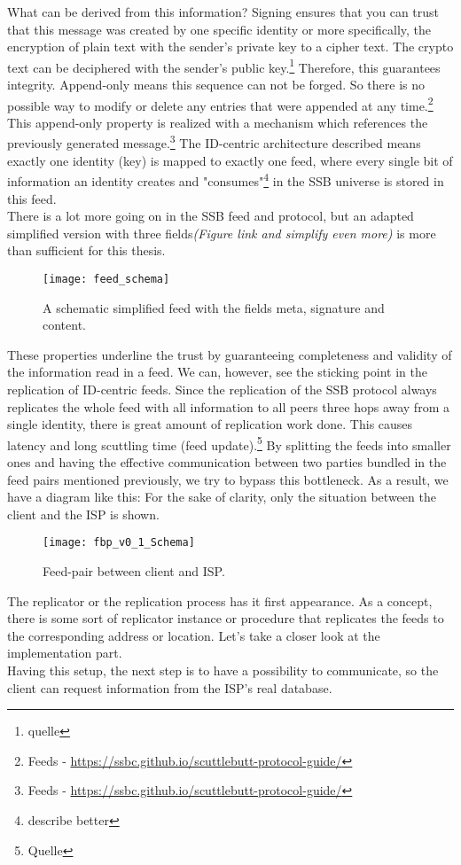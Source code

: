 What can be derived from this information? Signing ensures that you can trust that this message was created by one specific identity or more specifically, the encryption of plain text with the sender’s private key to a cipher text. The crypto text can be deciphered with the sender’s public key.\footnote{quelle} Therefore, this guarantees integrity. Append-only means this sequence can not be forged. So there is no possible way to modify or delete any entries that were appended at any time.\footnote{Feeds - \url{https://ssbc.github.io/scuttlebutt-protocol-guide/}} This append-only property is realized with a mechanism which references the previously generated message.\footnote{Feeds - \url{https://ssbc.github.io/scuttlebutt-protocol-guide/}} The ID-centric architecture described means exactly one identity (key) is mapped to exactly one feed, where every single bit of information an identity creates and "consumes"\footnote{describe better} in the SSB universe is stored in this feed.
\\
There is a lot more going on in the SSB feed and protocol, but an adapted simplified version with three fields\textit{(Figure link and simplify even more)} is more than sufficient for this thesis. 

\begin{figure}
    \centering
    \texttt{[image: feed\_schema]}
    \caption{A schematic simplified feed with the fields meta, signature and content.}
    \label{fig:feed_schema}
\end{figure}



These properties underline the trust by guaranteeing completeness and validity of the information read in a feed. We can, however, see the sticking point in the replication of ID-centric feeds. Since the replication of the SSB protocol always replicates the whole feed with all information to all peers three hops away from a single identity, there is great amount of replication work done. This causes latency and long scuttling time (feed update).\footnote{Quelle} By splitting the feeds into smaller ones and having the effective communication between two parties bundled in the feed pairs mentioned previously, we try to bypass this bottleneck. As a result, we have a diagram like this: For the sake of clarity, only the situation between the client and the ISP is shown. 

\begin{figure}
    \centering
    \texttt{[image: fbp\_v0\_1\_Schema]}
    \caption{Feed-pair between client and ISP.}
    \label{fig:contract_cli_isp}
\end{figure}
The replicator or the replication process has it first appearance. As a concept, there is some sort of replicator instance or procedure that replicates the feeds to the corresponding address or location. Let's take a closer look at the implementation part. \\
Having this setup, the next step is to have a possibility to communicate, so the client can request information from the ISP’s real database.

